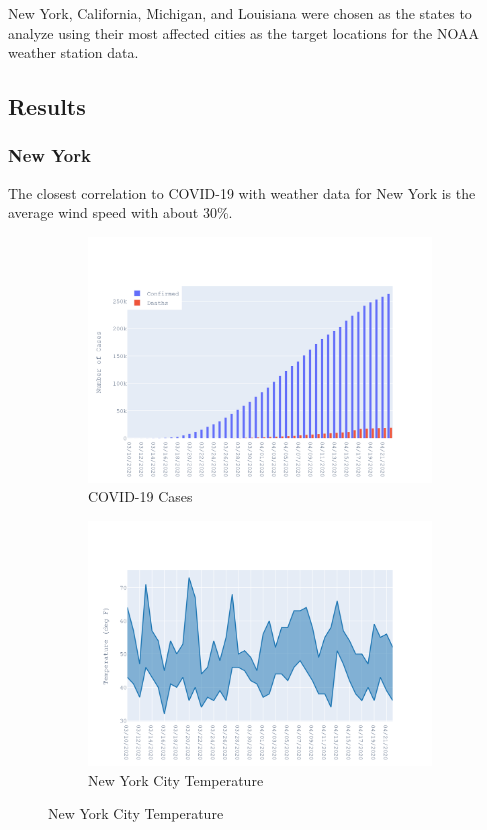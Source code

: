 \documentclass{homework}
\begin{document}
New York, California, Michigan, and Louisiana were chosen as the states to analyze using their most affected cities as the target locations for the NOAA weather station data.

\newpage
\subsection{Results}
\subsubsection{New York}

The closest correlation to COVID-19 with weather data for New York is the average wind speed with about 30\%.

\begin{figure}[H]
  \centering
  \begin{subfigure}{0.45\linewidth}
    \includegraphics[width=\linewidth]{task4/New York_cases.png}
    \caption{COVID-19 Cases}
  \end{subfigure}
  \hfil
  \begin{subfigure}{0.45\linewidth}
    \includegraphics[width=\linewidth]{task4/New York_temp.png}
    \caption{New York City Temperature}
  \end{subfigure}


\end{figure}
\end{document}

